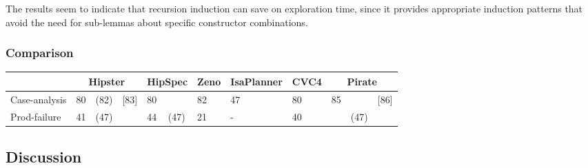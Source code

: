 The results seem to indicate that recursion induction can save on exploration time, since it provides appropriate induction patterns that avoid the need for sub-lemmas about specific constructor combinations.


\subsubsection{Comparison}

\begin{tabularx}{\textwidth}{l | X X X | X X | X | X | X | X X X}
  & \multicolumn{3}{|c|}{Hipster}
  	& \multicolumn{2}{c|}{HipSpec}
  	& \multicolumn{1}{c|}{Zeno}
  	& \multicolumn{1}{c|}{IsaPlanner}
  	& \multicolumn{1}{c|}{CVC4}
  	& \multicolumn{3}{c}{Pirate} \\
  \hline
  Case-analysis & 80 & (82) & [83] & 80 & & 82 & 47 & 80 & 85 & & [86] \\
  Prod-failure & 41 & (47) & & 44 & (47) & 21 & - & 40 & & (47) & \\
\end{tabularx}


\subsection{Discussion}   %
